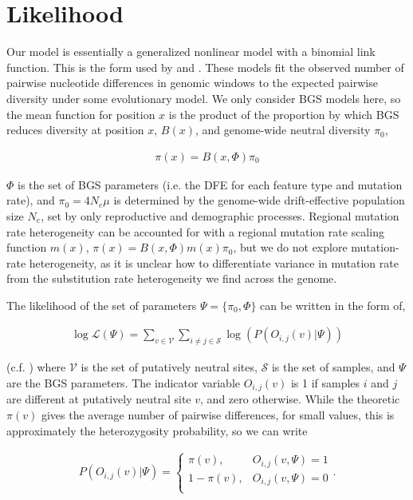 \documentclass[11pt]{article}
\begin{document}
\section*{Likelihood}

Our model is essentially a generalized nonlinear model with a binomial link
function. This is the form used by \textcite{Elyashiv2016-vt} and
\textcite{Murphy2022-sj}. These models fit the observed number of pairwise
nucleotide differences in genomic windows to the expected pairwise diversity
under some evolutionary model. We only consider BGS models here, so the mean
function for position $x$ is the product of the proportion by which BGS reduces
diversity at position $x$, $B(x)$, and genome-wide neutral diversity $\pi_0$,

\begin{align}
  \pi(x) = B(x, \Phi) \pi_0
\end{align}

$\Phi$ is the set of BGS parameters (i.e. the DFE for each feature type and
mutation rate), and $\pi_0 = 4 N_e \mu$ is determined by the genome-wide
drift-effective population size $N_e$, set by only reproductive and demographic
processes. Regional mutation rate heterogeneity can be accounted for with a
regional mutation rate scaling function $m(x)$, $\pi(x) = B(x, \Phi) m(x)
\pi_0$, but we do not explore mutation-rate heterogeneity, as it is unclear how
to differentiate variance in mutation rate from the substitution rate
heterogeneity we find across the genome.

The likelihood of the set of parameters $\Psi = \{\pi_0, \Phi\}$ can be written
in the form of, 

\begin{align}
  \log\mathcal{L}(\Psi) = \sum_{v \in \mathcal{V}} \sum_{i \ne j \in \mathcal{S}} \log(P(O_{i,j}(v) | \Psi))
\end{align}

(c.f. \cite{McVicker2009-ax,Elyashiv2016-vt,Murphy2022-sj}) where $\mathcal{V}$
is the set of putatively neutral sites, $\mathcal{S}$ is the set of samples,
and $\Psi$ are the BGS parameters. The indicator variable $O_{i,j}(v)$ is 1 if
samples $i$ and $j$ are different at putatively neutral site $v$, and zero
otherwise. While the theoretic $\pi(v)$ gives the average number of pairwise
differences, for small values, this is approximately the heterozygosity
probability, so we can write

\begin{align}
  P(O_{i,j}(v) | \Psi) = 
    \begin{cases}
      \pi(v), & O_{i,j}(v, \Psi) = 1 \\
      1-\pi(v), & O_{i,j}(v, \Psi) = 0 \\
    \end{cases}.
\end{align}
\end{document}
